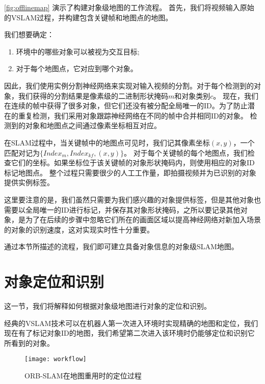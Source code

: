 \autoref{fig:offlinemap} 演示了构建对象级地图的工作流程。
首先，我们将视频输入原始的VSLAM过程\cite{mur2017orb}，并构建包含关键帧和地图点的地图。

我们想要确定：
\begin{enumerate}
	\item 环境中的哪些对象可以被视为交互目标;
	\item 对于每个地图点，它对应到哪个对象。
\end{enumerate}

因此，我们使用实例分割神经网络\cite{He_2017_ICCV}来实现对输入视频的分割。对于每个检测到的对象，我们获得的分割结果是像素级的二进制形状掩码$m$和对象类别$c$。
现在，我们在连续的帧中获得了很多对象，但它们还没有被分配全局唯一的ID。为了防止潜在的重复检测，我们采用对象跟踪神经网络在不同的帧中合并相同ID的对象。
检测到的对象和地图点之间通过像素坐标相互对应。

在SLAM过程中，当关键帧中的地图点可见时，我们记其像素坐标$(x,y)$，一个匹配对记为$\{Index_m,Index_{kf}, (x,y)\}$。
对于每个关键帧的每个地图点，我们检查它们的坐标。如果坐标位于该关键帧的对象形状掩码内，则使用相应的对象ID标记地图点。
整个过程只需要很少的人工工作量，即拍摄视频并为已识别的对象提供实例标签。

这里要注意的是，我们虽然只需要为我们感兴趣的对象提供标签，但是其他对象也需要以全局唯一的ID进行标记，并保存其对象形状掩码，之所以要记录其他对象，是为了在后续的步骤中忽略它们所在的画面区域以提高神经网络对新加入场景的对象的识别速度，这对实现实时性十分重要。

通过本节所描述的流程，我们即可建立具备对象信息的对象级SLAM地图。

\section{对象定位和识别}
这一节，我们将解释如何根据对象级地图进行对象的定位和识别。

经典的VSLAM\cite{mur2017orb,engel2014lsd}技术可以在机器人第一次进入环境时实现精确的地图和定位，我们现在有了标记对象ID的地图，我们希望第二次进入该环境时仍能够定位和识别它所看到的对象。

\begin{figure}[htbp]
  \centering
  \texttt{[image: workflow]}
  \caption{ORB-SLAM\cite{mur2017orb}在地图重用时的定位过程}
  \label{fig:localization}
\end{figure}

